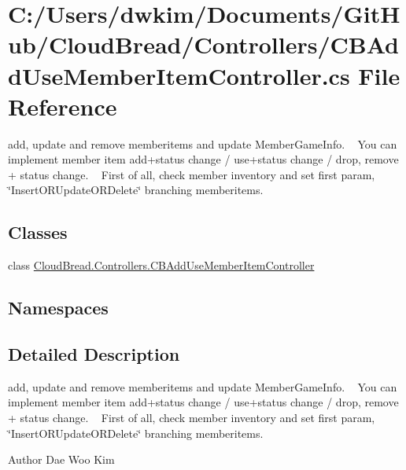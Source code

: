 \hypertarget{a00120}{}\section{C\+:/\+Users/dwkim/\+Documents/\+Git\+Hub/\+Cloud\+Bread/\+Controllers/\+C\+B\+Add\+Use\+Member\+Item\+Controller.cs File Reference}
\label{a00120}


add, update and remove memberitems and update Member\+Game\+Info. ~\newline
You can implement member item add+status change / use+status change / drop, remove + status change. ~\newline
First of all, check member inventory and set first param, \char`\"{}\+Insert\+O\+R\+Update\+O\+R\+Delete\char`\"{} branching memberitems.  


\subsection*{Classes}
\begin{DoxyCompactItemize}
\item 
class \hyperlink{a00007}{Cloud\+Bread.\+Controllers.\+C\+B\+Add\+Use\+Member\+Item\+Controller}
\end{DoxyCompactItemize}
\subsection*{Namespaces}
\begin{DoxyCompactItemize}
\end{DoxyCompactItemize}


\subsection{Detailed Description}
add, update and remove memberitems and update Member\+Game\+Info. ~\newline
You can implement member item add+status change / use+status change / drop, remove + status change. ~\newline
First of all, check member inventory and set first param, \char`\"{}\+Insert\+O\+R\+Update\+O\+R\+Delete\char`\"{} branching memberitems. 

\begin{DoxyAuthor}{Author}
Dae Woo Kim 
\end{DoxyAuthor}

